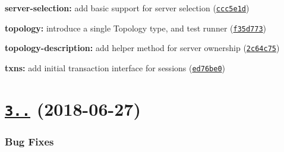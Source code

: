\begin{DoxyItemize}
\item {\bfseries server-\/selection\+:} add basic support for server selection (\href{https://github.com/mongodb-js/mongodb-core/commit/ccc5e1d}{\tt ccc5e1d})
\item {\bfseries topology\+:} introduce a single Topology type, and test runner (\href{https://github.com/mongodb-js/mongodb-core/commit/f35d773}{\tt f35d773})
\item {\bfseries topology-\/description\+:} add helper method for server ownership (\href{https://github.com/mongodb-js/mongodb-core/commit/2c64c75}{\tt 2c64c75})
\item {\bfseries txns\+:} add initial transaction interface for sessions (\href{https://github.com/mongodb-js/mongodb-core/commit/ed76be0}{\tt ed76be0})
\end{DoxyItemize}

\label{_3.1.0}%
 \section*{\href{https://github.com/mongodb-js/mongodb-core/compare/v3.0.6...v3.1.0}{\tt 3..} (2018-\/06-\/27)}

\subsubsection*{Bug Fixes}


